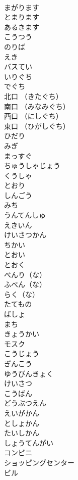 \documentclass[8pt]{extreport}
\begin{document}
\begin{CJK}{UTF8}{min}
\\	まがります	
\\	とまります	
\\	あるきます	
\\	こうつう	
\\	のりば	
\\	えき	
\\	バスてい	
\\	いりぐち	
\\	でぐち	
\\	北口 （きたぐち）	
\\	南口 （みなみぐち）	
\\	西口 （にしぐち）	
\\	東口 （ひがしぐち）	
\\	ひだり	
\\	みぎ	
\\	まっすぐ	
\\	ちゅうしゃじょう	
\\	くうしゃ	
\\	とおり	
\\	しんごう	
\\	みち	
\\	うんてんしゅ	
\\	えきいん	
\\	けいさつかん	
\\	ちかい	
\\	とおい 
\\	とおく	
\\	べんり（な）	
\\	ふべん（な）	
\\	らく（な）	
\\	たてもの	
\\	ばしょ	
\\	まち	
\\	きょうかい	
\\	モスク	
\\	こうじょう	
\\	ぎんこう	
\\	ゆうびんきょく	
\\	けいさつ	
\\	こうばん	
\\	どうぶつえん	
\\	えいがかん	
\\	としょかん	
\\	たいしかん	
\\	しょうてんがい	
\\	コンビニ	
\\	ショッピングセンター	
\\	ビル	

\end{CJK}
\end{document}
